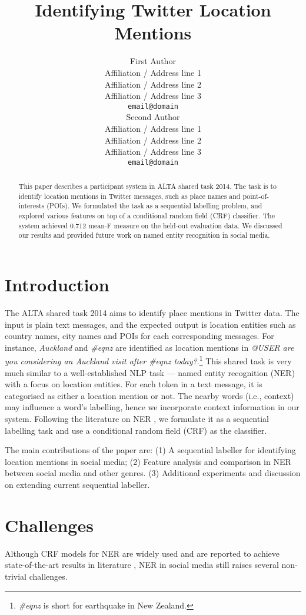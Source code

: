 \documentclass[11pt]{article}
\title{Identifying Twitter Location Mentions}
\author{First Author \\
  Affiliation / Address line 1 \\
  Affiliation / Address line 2 \\
  Affiliation / Address line 3 \\
  {\tt email@domain} \\\And
  Second Author \\
  Affiliation / Address line 1 \\
  Affiliation / Address line 2 \\
  Affiliation / Address line 3 \\
  {\tt email@domain} \\}
\date{}
\newcommand{\ie}{i.e.,\xspace}
\newcommand{\myex}[1]{\textit{#1}}
\begin{document}
\maketitle
\begin{abstract}
    This paper describes a participant system in ALTA shared task 2014.
    The task is to identify location mentions in Twitter messages, such as place names and point-of-interests (POIs).
    We formulated the task as a sequential labelling problem, and explored various features on top of a conditional random field (CRF) classifier.
    The system achieved 0.712 mean-F measure on the held-out evaluation data.
    We discussed our results and provided future work on named entity recognition in social media.
\end{abstract}

\section{Introduction}
\label{sec:intro}
The ALTA shared task 2014 aims to identify place mentions in Twitter data.
The input is plain text messages, and the expected output is location entities such as country names, city names and POIs for each corresponding messages.
For instance, \myex{Auckland} and \myex{\#eqnz} are identified as location mentions in \myex{@USER are you considering an Auckland visit after \#eqnz today?}.\footnote{\myex{\#eqnz} is short for earthquake in New Zealand.}
This shared task is very much similar to a well-established NLP task --- named entity recognition (NER) with a focus on location entities.
For each token in a text message, it is categorised as either a location mention or not.
The nearby words (\ie context) may influence a word's labelling, hence we incorporate context information in our system.
Following the literature on NER \cite{wwwc13ling}, we formulate it as a sequential labelling task and use a conditional random field (CRF) as the classifier.

The main contributions of the paper are:
(1) A sequential labeller for identifying location mentions in social media;
(2) Feature analysis and comparison in NER between social media and other genres.
(3) Additional experiments and discussion on extending current sequential labeller.

\section{Challenges}
\label{sec:challenge}
Although CRF models for NER are widely used and are reported to achieve state-of-the-art results in literature \cite{acl05fink,acl11liux,emnlp11ritt}, NER in social media still raises several non-trivial challenges.
\end{document}
